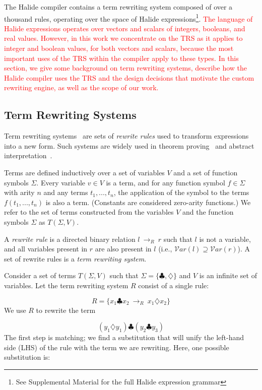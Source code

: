 \documentclass[acmsmall,review]{acmart}\settopmatter{printfolios=true,printccs=false,printacmref=false}
\newcommand{\modified}[1]{\textcolor{red}{{#1}}}
\newcommand{\rewrites}[0]{\:\rightarrow_{R}\:}
\begin{document}
The Halide compiler contains a term rewriting system composed of over a thousand
rules, operating over the space of Halide expressions\footnote{See Supplemental Material for
the full Halide expression grammar}.  \modified{The language of Halide expressions
operates over vectors and scalars of integers, booleans, and real values.  However, in
this work we concentrate on the TRS as it applies to integer and boolean values, for
both vectors and scalars, because the most important uses of the TRS within the compiler
apply to these types.  In this section, we give some background on term rewriting systems,
describe how the Halide compiler uses the TRS
and the design decisions that motivate the custom rewriting engine, as well as the scope
of our work.}

\subsection{Term Rewriting Systems}
Term rewriting systems~\cite{gorn1967} are sets of \textit{rewrite rules} used to transform expressions into a new form.  Such systems are widely
used in theorem proving~\cite{baader1999term} and abstract interpretation~\cite{cousot1977abstract, cousot1979systematic}.

Terms are defined inductively over a set of variables $V$ and a set of function symbols $\Sigma$. Every variable $v \in V$ is a term, and for any function symbol $f \in \Sigma$ with arity $n$ and any terms $t_1, ..., t_n$, the application of the symbol to the terms $f(t_1, ..., t_n)$ is also a term. (Constants are considered zero-arity functions.) We refer to the set of terms constructed from the variables $V$ and the function symbols $\Sigma$ as $T(\Sigma, V)$.

A \emph{rewrite rule} is a directed binary relation $l \rewrites r$ such that $l$ is not a variable, and all variables present in $r$ are also present in $l$ (i.e., $\mathcal{V}ar(l) \supseteq \mathcal{V}ar(r)$). A set of rewrite rules is a \emph{term rewriting system}.

Consider a set of terms $T(\Sigma, V)$ such that $\Sigma = \{\clubsuit, \diamondsuit\}$ and $V$ is an infinite set of variables. Let the term rewriting system $R$ consist of a single rule:

\[ R = \{ x_1 \clubsuit x_2 \rewrites x_1 \diamondsuit x_2 \} \]
We use $R$ to rewrite the term

\[ 
(y_1 \diamondsuit y_1) \clubsuit (y_2 \clubsuit y_3)
\]
The first step is matching; we find a substitution that will unify the left-hand side (LHS) of the rule with the term we are rewriting. Here, one possible substitution is:
\end{document}
